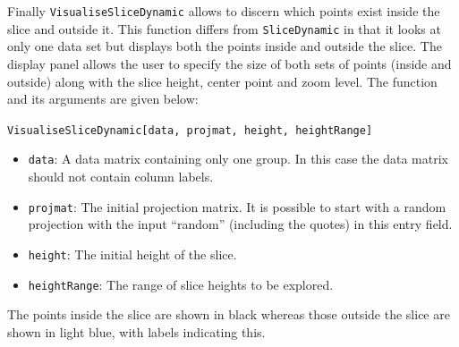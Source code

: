\documentclass[]{interact}
\theoremstyle{plain}%
\theoremstyle{definition}
\theoremstyle{remark}
\def\tightlist{}
\begin{document}
Finally \texttt{VisualiseSliceDynamic} allows to discern which points
exist inside the slice and outside it. This function differs from
\texttt{SliceDynamic} in that it looks at only one data set but displays
both the points inside and outside the slice. The display panel allows
the user to specify the size of both sets of points (inside and outside)
along with the slice height, center point and zoom level. The function
and its arguments are given below:

\texttt{VisualiseSliceDynamic{[}data,\ projmat,\ height,\ heightRange{]}}

\begin{itemize}
\tightlist
\item
  \texttt{data}: A data matrix containing only one group. In this case
  the data matrix should not contain column labels.
\item
  \texttt{projmat}: The initial projection matrix. It is possible to
  start with a random projection with the input ``random'' (including
  the quotes) in this entry field.
\item
  \texttt{height}: The initial height of the slice.
\item
  \texttt{heightRange}: The range of slice heights to be explored.
\end{itemize}

The points inside the slice are shown in black whereas those outside the
slice are shown in light blue, with labels indicating this.



\end{document}
